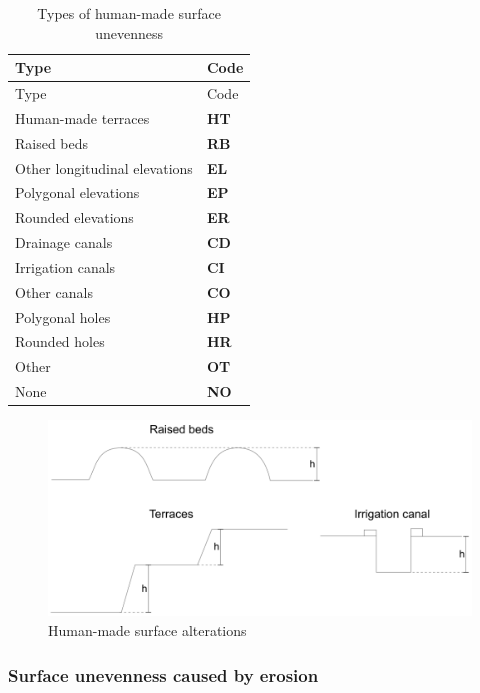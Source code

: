 \documentclass[
  letterpaper,
  DIV=11,
  numbers=noendperiod]{scrreprt}
\begin{document}
\begin{longtable}[]{@{}ll@{}}
\caption{Types of human-made surface unevenness}\tabularnewline
\toprule()
Type & Code \\
\midrule()
\endfirsthead
\toprule()
Type & Code \\
\midrule()
\endhead
Human-made terraces & \textbf{HT} \\
Raised beds & \textbf{RB} \\
Other longitudinal elevations & \textbf{EL} \\
Polygonal elevations & \textbf{EP} \\
Rounded elevations & \textbf{ER} \\
Drainage canals & \textbf{CD} \\
Irrigation canals & \textbf{CI} \\
Other canals & \textbf{CO} \\
Polygonal holes & \textbf{HP} \\
Rounded holes & \textbf{HR} \\
Other & \textbf{OT} \\
None & \textbf{NO} \\
\bottomrule()
\end{longtable}

\begin{figure}

{\centering \includegraphics{./figure_8-10.png}

}

\caption{Human-made surface alterations}

\end{figure}

\hypertarget{surface-unevenness-caused-by-erosion}{%
\subsubsection{Surface unevenness caused by
erosion}\label{surface-unevenness-caused-by-erosion}}
\end{document}
